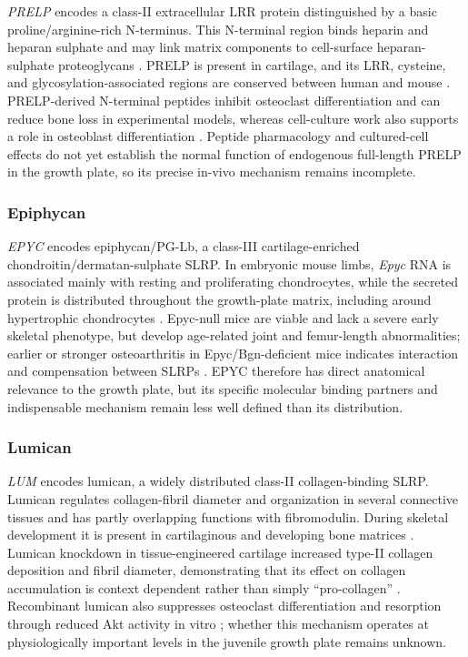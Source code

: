 \textit{PRELP} encodes a class-II extracellular LRR protein distinguished by a
basic proline/arginine-rich N-terminus. This N-terminal region binds heparin and
heparan sulphate and may link matrix components to cell-surface heparan-sulphate
proteoglycans \citep{Bengtsson2000}. PRELP is present in cartilage, and its LRR,
cysteine, and glycosylation-associated regions are conserved between human and
mouse \citep{Grover1996,Grover2002}. PRELP-derived N-terminal peptides inhibit
osteoclast differentiation and can reduce bone loss in experimental models,
whereas cell-culture work also supports a role in osteoblast differentiation
\citep{Rucci2009,Rucci2013,Li2016PRELP}. Peptide pharmacology and cultured-cell
effects do not yet establish the normal function of endogenous full-length PRELP
in the growth plate, so its precise in-vivo mechanism remains incomplete.

\subsubsection{Epiphycan}

\textit{EPYC} encodes epiphycan/PG-Lb, a class-III cartilage-enriched
chondroitin/dermatan-sulphate SLRP. In embryonic mouse limbs, \textit{Epyc} RNA
is associated mainly with resting and proliferating chondrocytes, while the
secreted protein is distributed throughout the growth-plate matrix, including
around hypertrophic chondrocytes \citep{Johnson1999}. Epyc-null mice are viable
and lack a severe early skeletal phenotype, but develop age-related joint and
femur-length abnormalities; earlier or stronger osteoarthritis in
Epyc/Bgn-deficient mice indicates interaction and compensation between SLRPs
\citep{Nuka2010}. EPYC therefore has direct anatomical relevance to the growth
plate, but its specific molecular binding partners and indispensable mechanism
remain less well defined than its distribution.

\subsubsection{Lumican}

\textit{LUM} encodes lumican, a widely distributed class-II collagen-binding
SLRP. Lumican regulates collagen-fibril diameter and organization in several
connective tissues and has partly overlapping functions with fibromodulin.
During skeletal development it is present in cartilaginous and developing bone
matrices \citep{Raouf2002}. Lumican knockdown in tissue-engineered cartilage
increased type-II collagen deposition and fibril diameter, demonstrating that
its effect on collagen accumulation is context dependent rather than simply
``pro-collagen'' \citep{Kafienah2008}. Recombinant lumican also suppresses
osteoclast differentiation and resorption through reduced Akt activity in
vitro \citep{Lee2021Lum}; whether this mechanism operates at physiologically
important levels in the juvenile growth plate remains unknown.

